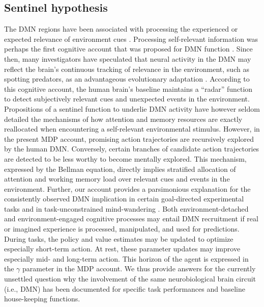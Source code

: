 \documentclass[10pt,letterpaper]{article}
\begin{document}
\subsection{Sentinel hypothesis}
The DMN regions have been associated with processing the
experienced or expected relevance of environment cues
\citep{montague2006imaging}.
Processing self-relevant information was perhaps the first
cognitive account that was proposed for DMN function
\citep{gusnard2001medial, raichle2001pnas}.
Since then,
many investigators have speculated that neural activity in the DMN
may reflect the brain's continuous tracking of
relevance in the environment, such as spotting predators,
as an advantageous evolutionary adaptation \citep{randy2008, hahn2007cingulate}.
According to this cognitive account, the human brain's baseline maintains
a ``radar'' function to
detect subjectively relevant cues and unexpected events in the environment.
Propositions of a sentinel function to underlie DMN activity
have however seldom detailed
the mechanisms of
how attention and memory resources are exactly reallocated when
encountering a self-relevant environmental stimulus.
However,
in the present MDP account,
promising action trajectories
are recursively explored by the human DMN. Conversely,
certain branches of candidate action trajectories
are detected to be less worthy to become mentally explored.
This mechanism, expressed by the Bellman equation,
directly implies stratified allocation of attention and working memory load
over relevant cues and events in the environment.
%
Further,
our account provides a parsimonious explanation for
the consistently observed DMN implication
in certain goal-directed experimental tasks and
in task-unconstrained mind-wandering \citep{smith2009, bzdok2016formal}.
Both environment-detached and environment-engaged
cognitive processes may entail DMN recruitment
if real or imagined experience is processed, manipulated, and
used for predictions.
During tasks,
the policy and value estimates may be
updated to optimize especially short-term action.
At rest, these parameter updates may
improve especially mid- and long-term action.
This horizon of the agent
is expressed in the $\gamma$ parameter in the MDP account.
We thus provide answers for the currently unsettled question why the involvement
of the same neurobiological brain circuit (i.e., DMN) has been documented
for specific task performances and baseline house-keeping functions.
\end{document}
